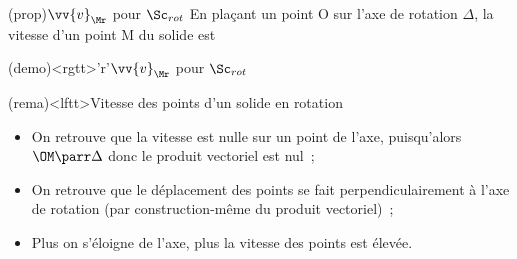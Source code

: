 \documentclass[../../main/main.tex]{subfiles}
\begin{document}
\begin{tcbraster}[raster equal height=rows, raster columns=2]
	\begin{tcb*}(prop){$\protect\vv{v}_{\Mr}$ pour $\Sc_{rot}$}
		En plaçant un point O sur l'axe de rotation $\Delta$, la vitesse d'un point
		M du solide est
		\psw{
			\[
				\boxed{\vf_{\Mr/\Rc}(t) = \wf_{\Sc/\Rc} \wedge \OM}
			\]
		}
		\vspace{-15pt}
	\end{tcb*}
	\begin{tcb*}(demo)<rgtt>'r'{$\protect\vv{v}_{\Mr}$ pour $\Sc_{rot}$}
		\vspace{-15pt}
		\vspace{-15pt}
	\end{tcb*}
\end{tcbraster}

\begin{tcb*}(rema)<lftt>{Vitesse des points d'un solide en rotation}
	\begin{itemize}
		\item On retrouve que la vitesse est nulle sur un point de l'axe,
		      puisqu'alors $\OM \parr \Delta$ donc le produit vectoriel est nul~;
		\item On retrouve que le déplacement des points se fait perpendiculairement
		      à l'axe de rotation (par construction-même du produit vectoriel)~;
		\item Plus on s'éloigne de l'axe, plus la vitesse des points est élevée.
	\end{itemize}
\end{tcb*}
\end{document}
